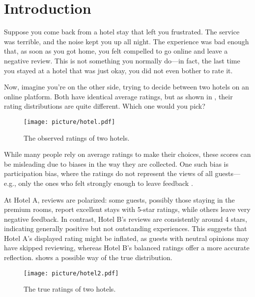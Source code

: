 \section{Introduction}

Suppose you come back from a hotel stay that left you frustrated. The service was terrible, and the noise kept you up all night. The experience was bad enough that, as soon as you got home, you felt compelled to go online and leave a negative review. This is not something you normally do—in fact, the last time you stayed at a hotel that was just okay, you did not even bother to rate it. 

Now, imagine you're on the other side, trying to decide between two hotels on an online platform. Both have identical average ratings, but as shown in , their rating distributions are quite different. Which one would you pick?

\begin{figure}
    \centering
    \texttt{[image: picture/hotel.pdf]}
    \caption{The observed ratings of two hotels.}
    \label{fig:hotel}
\end{figure}

While many people rely on average ratings to make their choices, these scores can be misleading due to biases in the way they are collected. One such bias is participation bias, where the ratings do not represent the views of all guests—e.g., only the ones who felt strongly enough to leave feedback \cite{bhole2017effectiveness,zhu2022bias}. 


At Hotel A, reviews are polarized: some guests, possibly those staying in the premium rooms, report excellent stays with 5-star ratings, while others leave very negative feedback. In contrast, Hotel B’s reviews are consistently around 4 stars, indicating generally positive but not outstanding experiences. This suggests that Hotel A's displayed rating might be inflated, as guests with neutral opinions may have skipped reviewing, whereas Hotel B’s balanced ratings offer a more accurate reflection.  shows a possible way of the true distribution.

\begin{figure}
    \centering
    \texttt{[image: picture/hotel2.pdf]}
    \caption{The true ratings of two hotels.}
    \label{fig:hotel2}
\end{figure}

